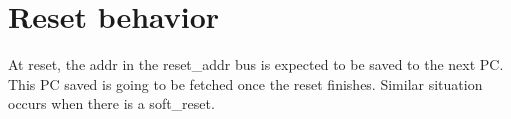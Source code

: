 \section{Reset behavior}

At reset, the addr in the reset\_addr bus is expected to be saved to the next PC. This PC saved is going to be fetched once the reset finishes. Similar situation occurs when there is a soft\_reset.